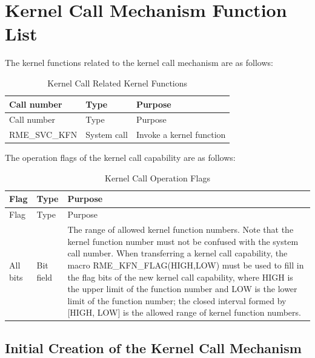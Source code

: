 \section{Kernel Call Mechanism Function List}\label{sec:6-kernel-call-function-list}

The kernel functions related to the kernel call mechanism are as follows:

\begin{xltabular}{\textwidth}{@{}>{\hsize\raggedright\arraybackslash}X>{\hsize\raggedright\arraybackslash}X>{\hsize\raggedright\arraybackslash}X@{}}
\caption{Kernel Call Related Kernel Functions}\label{tab:6-1-kernel-call-related-kernel-functions}\\
\toprule
Call number & Type & Purpose\tabularnewline
\endfirsthead
\toprule
Call number & Type & Purpose\tabularnewline
\midrule
\endhead
\bottomrule
\endlastfoot
RME\_SVC\_KFN & System call & Invoke a kernel function\tabularnewline
\end{xltabular}
\nopagebreak[4]

The operation flags of the kernel call capability are as follows:

\begin{xltabular}{\textwidth}{@{}>{\hsize\raggedright\arraybackslash}X>{\hsize\raggedright\arraybackslash}X>{\hsize\raggedright\arraybackslash}X@{}}
\caption{Kernel Call Operation Flags}\label{tab:6-2-kernel-call-operation-flags}\\
\toprule
Flag & Type & Purpose\tabularnewline
\endfirsthead
\toprule
Flag & Type & Purpose\tabularnewline
\midrule
\endhead
\bottomrule
\endlastfoot
All bits & Bit field &
The range of allowed kernel function numbers. Note that the kernel function number must not be confused with the system call number. When transferring a kernel call capability, the macro RME\_KFN\_FLAG(HIGH,LOW) must be used to fill in the flag bits of the new kernel call capability, where HIGH is the upper limit of the function number and LOW is the lower limit of the function number; the closed interval formed by [HIGH, LOW] is the allowed range of kernel function numbers.\tabularnewline
\end{xltabular}
\nopagebreak[4]

\subsection{Initial Creation of the Kernel Call Mechanism}\label{subsec:6-kernel-call-initial-creation}

